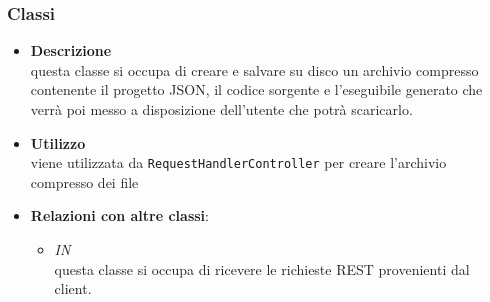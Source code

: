 \subsubsection{Classi}
\label{\nogloxy{swedesigner::server::utility::Compressor}}
\begin{itemize}
\item \textbf{Descrizione}\\
questa classe si occupa di creare e salvare su disco un archivio compresso contenente il progetto JSON, il codice sorgente e l'eseguibile generato che verrà poi messo a disposizione dell'utente che potrà scaricarlo.
\item \textbf{Utilizzo}\\
viene utilizzata da \texttt{RequestHandlerController} per creare l'archivio compresso dei file
\item \textbf{Relazioni con altre classi}:
\begin{itemize}
\item \textit{IN} \hyperref[\nogloxy{swedesigner::server::controller::RequestHandlerController}]{}\\
questa classe si occupa di ricevere le richieste REST provenienti dal client.
\end{itemize}
\end{itemize}
